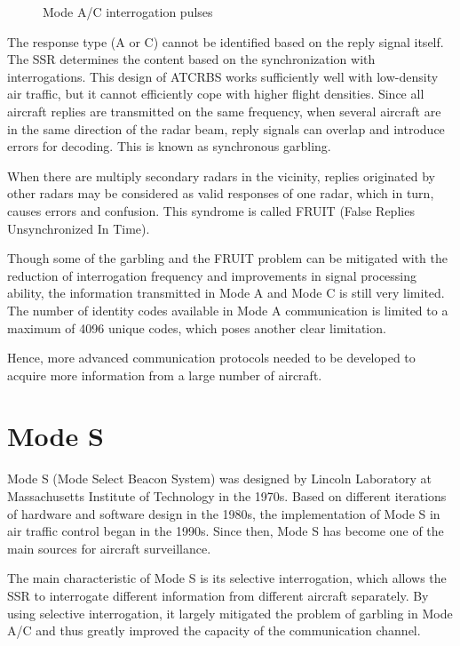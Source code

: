 \begin{figure}[ht]
  \scalebox{0.9}{
    
  }
  \caption{Mode A/C interrogation pulses}
  \label{fig:mode_ac_downlink_pulses}
\end{figure}

The response type (A or C) cannot be identified based on the reply signal itself. The SSR determines the content based on the synchronization with interrogations. This design of ATCRBS works sufficiently well with low-density air traffic, but it cannot efficiently cope with higher flight densities. Since all aircraft replies are transmitted on the same frequency, when several aircraft are in the same direction of the radar beam, reply signals can overlap and introduce errors for decoding. This is known as synchronous garbling.

When there are multiply secondary radars in the vicinity, replies originated by other radars may be considered as valid responses of one radar, which in turn, causes errors and confusion. This syndrome is called FRUIT (False Replies Unsynchronized In Time).

Though some of the garbling and the FRUIT problem can be mitigated with the reduction of interrogation frequency and improvements in signal processing ability, the information transmitted in Mode A and Mode C is still very limited. The number of identity codes available in Mode A communication is limited to a maximum of 4096 unique codes, which poses another clear limitation.

Hence, more advanced communication protocols needed to be developed to acquire more information from a large number of aircraft.



\section{Mode S}

Mode S (Mode Select Beacon System) was designed by Lincoln Laboratory at Massachusetts Institute of Technology in the 1970s. Based on different iterations of hardware and software design in the 1980s, the implementation of Mode S in air traffic control began in the 1990s. Since then, Mode S has become one of the main sources for aircraft surveillance.

The main characteristic of Mode S is its selective interrogation, which allows the SSR to interrogate different information from different aircraft separately. By using selective interrogation, it largely mitigated the problem of garbling in Mode A/C and thus greatly improved the capacity of the communication channel.

